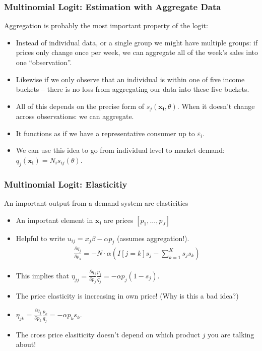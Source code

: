 \documentclass[xcolor=pdftex,dvipsnames,table,mathserif]{beamer}
\begin{document}
\begin{frame}
\frametitle{Multinomial Logit: Estimation with Aggregate Data}
\alert{Aggregation} is probably the most important property of the  logit:
\begin{itemize}
\item Instead of individual data, or a single group we might have multiple groups: if prices only change once per week, we can aggregate all of the week's sales into one ``observation''.
\item Likewise if we only observe that an individual is within one of five income buckets -- there is no loss from aggregating our data into these five buckets.
\item All of this depends on the precise form of $ s_{j}(\mathbf{x_i},\theta)$. When it doesn't change across observations: we can aggregate.
\item It functions as if we have a representative consumer up to $\varepsilon_{i}$.
\item We can use this idea to go from individual level to market demand: $q_j(\mathbf{x_i}) = N_i s_{ij}(\theta)$.
\end{itemize}
\end{frame}

\begin{frame}
\frametitle{Multinomial Logit: Elasticitiy}
An important output from a demand system are elasticities
\begin{itemize}
\item An important element in $\mathbf{x_i}$ are prices $[p_{1},\ldots,p_J]$
\item Helpful to write $u_{ij} = x_j \beta -\alpha p_j$ (assumes aggregation!).
\begin{eqnarray*}
\frac{\partial q_j}{\partial p_k} =-N \cdot \alpha \left(I[j = k] s_j -\sum_{k=1}^K s_j s_k \right)
\end{eqnarray*}
\item This implies that $ \eta_{jj} = \frac{\partial q_j}{\partial p_j} \frac{p_j}{q_j}  = -\alpha p_j (1-s_j)$.
\item The price elasticity is increasing in own price! (Why is this a bad idea?)
\item  $ \eta_{jk} = \frac{\partial q_j}{\partial p_k} \frac{p_k}{q_j}  = -\alpha p_k s_k$.
\item The cross price elasiticity doesn't depend on which product $j$ you are talking about!
\end{itemize}
\end{frame}
\end{document}
